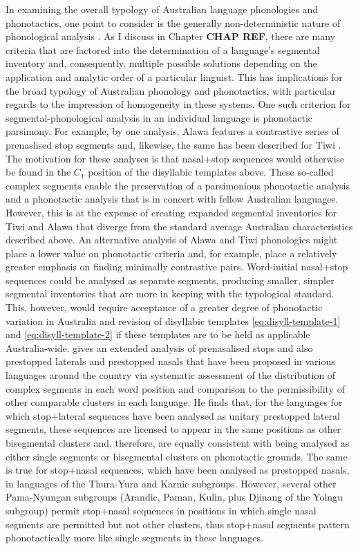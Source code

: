 In examining the overall typology of Australian language phonologies and phonotactics, one point to consider is the generally non-deterministic nature of phonological analysis \autocites{chao_non-uniqueness_1934}{hockett_problem_1963}{hyman_universals_2008}{dresher_contrastive_2009}. As I discuss in Chapter \textbf{CHAP REF}, there are many criteria that are factored into the determination of a language's segmental inventory and, consequently, multiple possible solutions depending on the application and analytic order of a particular linguist. This has implications for the broad typology of Australian phonology and phonotactics, with particular regards to the impression of homogeneity in these systems. One such criterion for segmental-phonological analysis in an individual language is phonotactic parsimony. For example, by one analysis, Alawa features a contrastive series of prenaslised stop segments \autocite{sharpe_alawa_1972} and, likewise, the same has been described for Tiwi \autocite{lee_tiwi_1987}. The motivation for these analyses is that nasal+stop sequences would otherwise be found in the \(C_1\) position of the disyllabic templates above. These so-called complex segments enable the preservation of a parsimonious phonotactic analysis and a phonotactic analysis that is in concert with fellow Australian languages. However, this is at the expense of creating expanded segmental inventories for Tiwi and Alawa that diverge from the standard average Australian characteristics described above. An alternative analysis of Alawa and Tiwi phonologies might place a lower value on phonotactic criteria and, for example, place a relatively greater emphasis on finding minimally contrastive pairs. Word-initial nasal+stop sequences could be analysed as separate segments, producing smaller, simpler segmental inventories that are more in keeping with the typological standard. This, however, would require acceptance of a greater degree of phonotactic variation in Australia and revision of disyllabic templates \eqref{eq:disyll-template-1} and \eqref{eq:disyll-template-2} if these templates are to be held as applicable Australia-wide. \textcite{round_phonotactics_2021} gives an extended analysis of prenasalised stops and also prestopped laterals and prestopped nasals that have been proposed in various languages around the country via systematic assessment of the distribution of complex segments in each word position and comparison to the permissibility of other comparable clusters in each language. He finds that, for the languages for which stop+lateral sequences have been analysed as unitary prestopped lateral segments, these sequences are licensed to appear in the same positions as other bisegmental clusters and, therefore, are equally consistent with being analysed as either single segments or bisegmental clusters on phonotactic grounds. The same is true for stop+nasal sequences, which have been analysed as prestopped nasals, in languages of the Thura-Yura and Karnic subgroups. However, several other Pama-Nyungan subgroups (Arandic, Paman, Kulin, plus Djinang of the Yolngu subgroup) permit stop+nasal sequences in positions in which single nasal segments are permitted but not other clusters, thus stop+nasal segments pattern phonotactically more like single segments in these languages. 